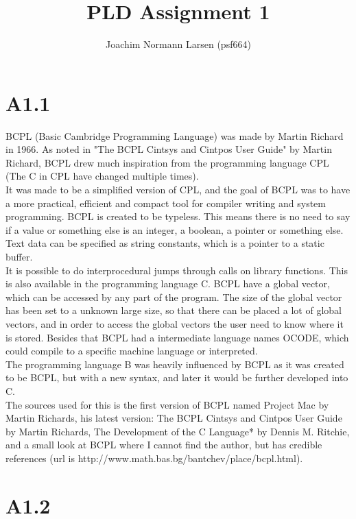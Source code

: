 \documentclass[10pt,a4paper]{article}      %
\title{PLD Assignment 1}
\author{Joachim Normann Larsen (psf664)}
\begin{document}
\hfuzz=50pt
\maketitle


\clearpage

\section*{A1.1}
BCPL (Basic Cambridge Programming Language) was made by Martin Richard in 1966. As noted in "The BCPL Cintsys and Cintpos User Guide" by Martin Richard, BCPL drew much inspiration from the programming language CPL (The C in CPL have changed multiple times). \\
It was made to be a simplified version of CPL, and the goal of BCPL was to have a more practical, efficient and compact tool for compiler writing and system programming.
BCPL is created to be typeless. This means there is no need to say if a value or something else is an integer, a boolean, a pointer or something else. Text data can be specified as string constants, which is a pointer to a static buffer. \\
It is possible to do interprocedural jumps through calls on library functions. This is also available in the programming language C. BCPL have a global vector, which can be accessed by any part of the program. The size of the global vector has been set to a unknown large size, so that there can be placed a lot of global vectors, and in order to access the global vectors the user need to know where it is stored.
Besides that BCPL had a intermediate language names OCODE, which could compile to a specific machine language or interpreted. \\
The programming language B was heavily influenced by BCPL as it was created to be BCPL, but with a new syntax, and later it would be further developed into C.
\\
The sources used for this is the first version of BCPL named Project Mac by Martin Richards, his latest version: The BCPL Cintsys and Cintpos User Guide by Martin Richards, The Development of the C Language* by Dennis M. Ritchie, and a small look at BCPL where I cannot find the author, but has credible references (url is http://www.math.bas.bg/bantchev/place/bcpl.html).

\section*{A1.2}
\end{document}
